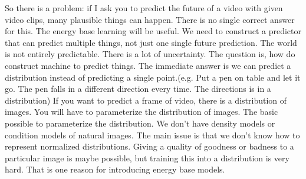 \documentclass{article}
\begin{document}
So there is a problem: if I ask you to predict the future of a video with given video clips, many plausible things can happen. There is no single correct answer for this. The energy base learning will be useful. We need to construct a predictor that can predict multiple things, not just one single future prediction. The world is not entirely predictable. There is a lot of uncertainty. The question is, how do construct machine to predict things. The immediate answer is we can predict a distribution instead of predicting a single point.(e.g. Put a pen on table and let it go. The pen falls in a different direction every time. The directions is in a distribution) If you want to predict a frame of video, there is a distribution of images. You will have to parameterize the distribution of images. The basic possible to parameterize the distribution. We don't have density models or condition models of natural images. The main issue is that we don't know how to represent normalized distributions. Giving a quality of goodness or badness to a particular image is maybe possible, but training this into a distribution is very hard. That is one reason for introducing energy base models.
\end{document}
